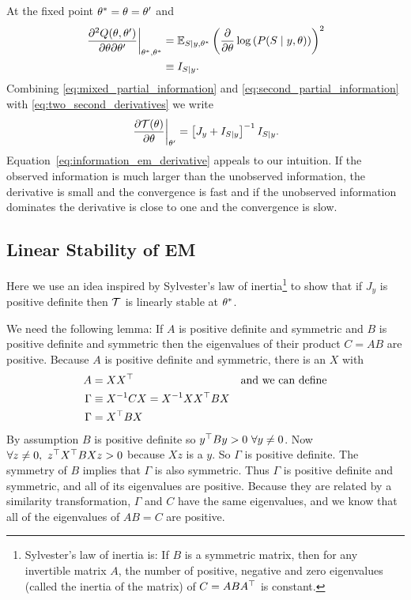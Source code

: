At the fixed point ${\theta^*} = \theta = \theta'$ and
\begin{align}
  \left. \frac{\partial^2 Q(\theta,  \theta')}{\partial \theta
  \partial \theta'} \right|_{{\theta^*}, {\theta^*}}
  &= \mathbb{E}_{S \mid y, {\theta^*}} \left( \frac{\partial}{\partial
    \theta} \log \left( P(S \mid y, \theta )\right) \right)^2\\
  \label{eq:mixed_partial_information}
  &\equiv I_{S|y}.
\end{align}
Combining \eqref{eq:mixed_partial_information} and
\eqref{eq:second_partial_information} with
\eqref{eq:two_second_derivatives} we write
\begin{equation}
  \label{eq:information_em_derivative}
  \left.\frac{\partial \EMmap(\theta)}{\partial \theta}
  \right|_{\theta'} = \left[J_y + I_{S|y}  \right]^{-1} I_{S|y}.
\end{equation}
Equation~\eqref{eq:information_em_derivative} appeals to our
intuition.  If the observed information is much larger than the
unobserved information, the derivative is small and the convergence is
fast and if the unobserved information dominates the derivative is
close to one and the convergence is slow.

\subsection*{Linear Stability of EM}
\label{em_stabiltiy}

Here we use an idea inspired by Sylvester's law of
inertia\footnote{Sylvester's law of inertia is: If $B$ is a symmetric
  matrix, then for any invertible matrix $A$, the number of positive,
  negative and zero eigenvalues (called the inertia of the matrix) of
  $C = A B A^\top$ is constant.} to show that if $J_y$ is positive definite
then $\EMmap$ is linearly stable at ${\theta^*}$.

We need the following lemma: If $A$ is positive definite and symmetric
and $B$ is positive definite and symmetric then the eigenvalues of
their product $C = AB$ are positive.  Because $A$ is positive
definite and symmetric, there is an $X$ with
\begin{align*}
  A &= X X^\top  &&\text{and we can define}\\
  \Gamma &\equiv X^{-1} C X = X^{-1} X X^\top B X \\
  \Gamma &= X^\top B X \\
\end{align*}
By assumption $B$ is positive definite so
$y^\top B y > 0 ~ \forall y \neq 0$.  Now
$\forall z \neq 0, ~ z^\top X^\top B X z > 0$ because $Xz$ is
a $y$.  So $\Gamma$ is positive definite.  The symmetry of $B$ implies
that $\Gamma$ is also symmetric.  Thus $\Gamma$ is positive definite
and symmetric, and all of its eigenvalues are positive.  Because they are related by a
similarity transformation, $\Gamma$ and $C$ have the same eigenvalues,
and we know that all of the eigenvalues of $AB = C$ are positive.

